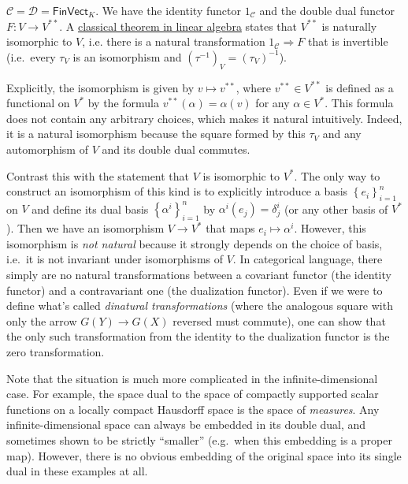 \begin{example}
$\mathcal{C}=\mathcal{D}=\mathsf{FinVect}_{K}$. We have the identity
functor $1_{\mathcal{C}}$ and the double dual functor $F:V\to V^{\ast\ast}$.
A \href{https://en.wikipedia.org/wiki/Dual_space\#Double_dual}{classical theorem in linear algebra}
states that $V^{\ast\ast}$ is naturally isomorphic to $V$, i.e.
there is a natural transformation $1_{\mathcal{C}}\Longrightarrow F$
that is invertible (i.e.\ every $\tau_{V}$ is an isomorphism and $\left(\tau^{-1}\right)_{V}=\left(\tau_{V}\right)^{-1}$).

Explicitly, the isomorphism is given by $v\mapsto v^{\ast\ast}$,
where $v^{\ast\ast}\in V^{\ast\ast}$ is defined as a functional on
$V^{\ast}$ by the formula $v^{\ast\ast}\left(\alpha\right)=\alpha\left(v\right)$
for any $\alpha\in V^{\ast}$. This formula does not contain any arbitrary
choices, which makes it natural intuitively. Indeed, it is a natural isomorphism because 
the square formed by this $\tau_V$ and any automorphism of $V$ and its double dual commutes.

Contrast this with the statement that $V$ is isomorphic to $V^{\ast}$.
The only way to construct an isomorphism of this kind is to explicitly introduce
a basis $\left\{ e_{i}\right\} _{i=1}^{n}$ on $V$ and define its
dual basis $\left\{ \alpha^{i}\right\} _{i=1}^{n}$ by $\alpha^{i}\left(e_{j}\right)=\delta_{j}^{i}$ (or any other basis of $V^\ast$).
Then we have an isomorphism $V\to V^{\ast}$ that maps $e_{i}\mapsto\alpha^{i}$.
However, this isomorphism is \emph{not natural} because it strongly
depends on the choice of basis, i.e.\ it is not invariant under isomorphisms
of $V$. In categorical language, there simply are no natural transformations between a covariant functor (the identity functor) and a contravariant one (the dualization functor). Even if we were to define what's called \emph{dinatural transformations} (where the analogous square with only the arrow $G(Y)\to G(X)$ reversed must commute), one can show that the only such transformation from the identity to the dualization functor is the zero transformation.

Note that the situation is much more complicated in the infinite-dimensional case. For example, the space dual to the space of compactly supported scalar functions on a locally compact Hausdorff space is the space of \emph{measures}. Any infinite-dimensional space can always be embedded in its double dual, and sometimes shown to be strictly ``smaller'' (e.g.\ when this embedding is a proper map). However, there is no obvious embedding of the original space into its single dual in these examples at all.
\end{example}
